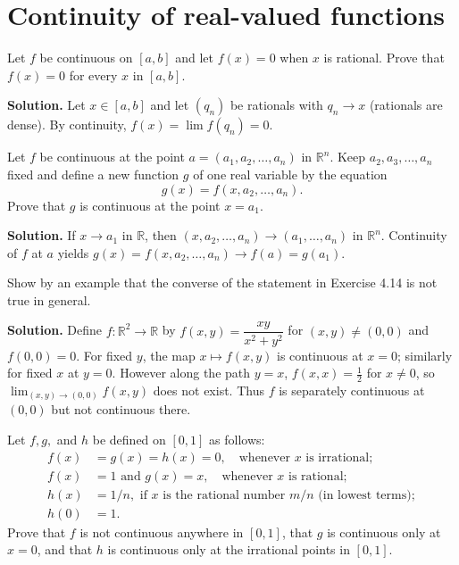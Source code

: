 \section{Continuity of real-valued functions}

\begin{problembox}
Let \( f \) be continuous on \([a, b]\) and let \( f(x) = 0 \) when \( x \) is rational. Prove that \( f(x) = 0 \) for every \( x \) in \([a, b]\).
\end{problembox}

\noindent\textbf{Solution.}
Let $x\in[a,b]$ and let $(q_n)$ be rationals with $q_n\to x$ (rationals are dense). By continuity, $f(x)=\lim f(q_n)=0$.
\medskip

\begin{problembox}
Let \( f \) be continuous at the point \( a = (a_1, a_2, \ldots, a_n) \) in \( \mathbb{R}^n \). Keep \( a_2, a_3, \ldots, a_n \) fixed and define a new function \( g \) of one real variable by the equation
\[g(x) = f(x, a_2, \ldots, a_n).\]
Prove that \( g \) is continuous at the point \( x = a_1 \).
\end{problembox}

\noindent\textbf{Solution.}
If $x\to a_1$ in $\mathbb{R}$, then $(x,a_2,\ldots,a_n)\to(a_1,\ldots,a_n)$ in $\mathbb{R}^n$. Continuity of $f$ at $a$ yields $g(x)=f(x,a_2,\ldots,a_n)\to f(a)=g(a_1)$.
\medskip

\begin{problembox}
Show by an example that the converse of the statement in Exercise 4.14 is not true in general.
\end{problembox}

\noindent\textbf{Solution.}
Define $f:\mathbb{R}^2\to\mathbb{R}$ by $f(x,y)=\dfrac{xy}{x^2+y^2}$ for $(x,y)\ne(0,0)$ and $f(0,0)=0$. For fixed $y$, the map $x\mapsto f(x,y)$ is continuous at $x=0$; similarly for fixed $x$ at $y=0$. However along the path $y=x$, $f(x,x)=\tfrac{1}{2}$ for $x\ne0$, so $\lim_{(x,y)\to(0,0)}f(x,y)$ does not exist. Thus $f$ is separately continuous at $(0,0)$ but not continuous there.
\medskip

\begin{problembox}
Let \( f, g, \) and \( h \) be defined on \([0, 1]\) as follows:
\begin{align*}
f(x) &= g(x) = h(x) = 0, \quad \text{whenever } x \text{ is irrational}; \\
f(x) &= 1 \text{ and } g(x) = x, \quad \text{whenever } x \text{ is rational}; \\
h(x) &= 1/n, \text{ if } x \text{ is the rational number } m/n \text{ (in lowest terms)}; \\
h(0) &= 1.
\end{align*}
Prove that \( f \) is not continuous anywhere in \([0, 1]\), that \( g \) is continuous only at \( x = 0 \), and that \( h \) is continuous only at the irrational points in \([0, 1]\).
\end{problembox}


